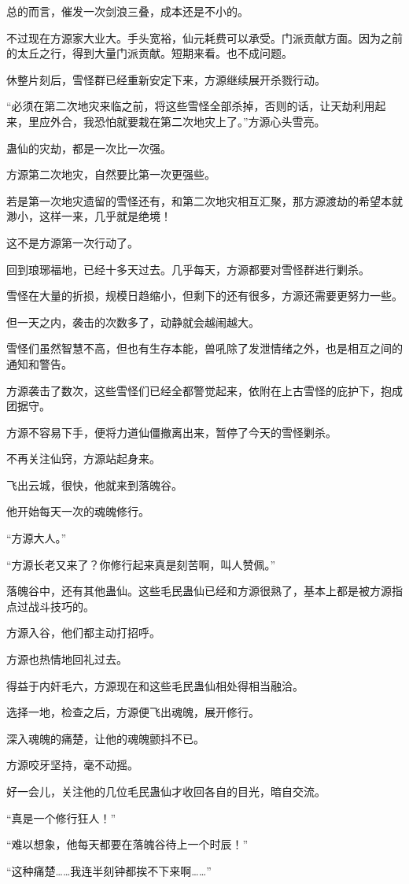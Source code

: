 \begin{this_body}
总的而言，催发一次剑浪三叠，成本还是不小的。

不过现在方源家大业大。手头宽裕，仙元耗费可以承受。门派贡献方面。因为之前的太丘之行，得到大量门派贡献。短期来看。也不成问题。

休整片刻后，雪怪群已经重新安定下来，方源继续展开杀戮行动。

“必须在第二次地灾来临之前，将这些雪怪全部杀掉，否则的话，让天劫利用起来，里应外合，我恐怕就要栽在第二次地灾上了。”方源心头雪亮。

蛊仙的灾劫，都是一次比一次强。

方源第二次地灾，自然要比第一次更强些。

若是第一次地灾遗留的雪怪还有，和第二次地灾相互汇聚，那方源渡劫的希望本就渺小，这样一来，几乎就是绝境！

这不是方源第一次行动了。

回到琅琊福地，已经十多天过去。几乎每天，方源都要对雪怪群进行剿杀。

雪怪在大量的折损，规模日趋缩小，但剩下的还有很多，方源还需要更努力一些。

但一天之内，袭击的次数多了，动静就会越闹越大。

雪怪们虽然智慧不高，但也有生存本能，兽吼除了发泄情绪之外，也是相互之间的通知和警告。

方源袭击了数次，这些雪怪们已经全都警觉起来，依附在上古雪怪的庇护下，抱成团据守。

方源不容易下手，便将力道仙僵撤离出来，暂停了今天的雪怪剿杀。

不再关注仙窍，方源站起身来。

飞出云城，很快，他就来到落魄谷。

他开始每天一次的魂魄修行。

“方源大人。”

“方源长老又来了？你修行起来真是刻苦啊，叫人赞佩。”

落魄谷中，还有其他蛊仙。这些毛民蛊仙已经和方源很熟了，基本上都是被方源指点过战斗技巧的。

方源入谷，他们都主动打招呼。

方源也热情地回礼过去。

得益于内奸毛六，方源现在和这些毛民蛊仙相处得相当融洽。

选择一地，检查之后，方源便飞出魂魄，展开修行。

深入魂魄的痛楚，让他的魂魄颤抖不已。

方源咬牙坚持，毫不动摇。

好一会儿，关注他的几位毛民蛊仙才收回各自的目光，暗自交流。

“真是一个修行狂人！”

“难以想象，他每天都要在落魄谷待上一个时辰！”

“这种痛楚……我连半刻钟都挨不下来啊……”

\end{this_body}

